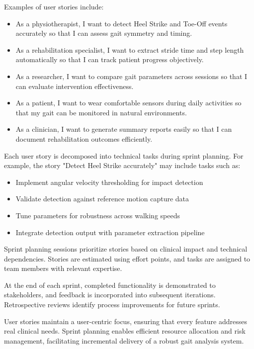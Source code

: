 \documentclass[12pt,a4paper]{report}
\begin{document}
Examples of user stories include:
\begin{itemize}
    

\item As a physiotherapist, I want to detect Heel Strike and Toe-Off events accurately so that I can assess gait symmetry and timing.

\item As a rehabilitation specialist, I want to extract stride time and step length automatically so that I can track patient progress objectively.

\item As a researcher, I want to compare gait parameters across sessions so that I can evaluate intervention effectiveness.

\item As a patient, I want to wear comfortable sensors during daily activities so that my gait can be monitored in natural environments.

\item As a clinician, I want to generate summary reports easily so that I can document rehabilitation outcomes efficiently.
\end{itemize}
Each user story is decomposed into technical tasks during sprint planning. For example, the story "Detect Heel Strike accurately" may include tasks such as:
\begin{itemize}
\item Implement angular velocity thresholding for impact detection

\item Validate detection against reference motion capture data

\item Tune parameters for robustness across walking speeds

\item Integrate detection output with parameter extraction pipeline
\end{itemize}
Sprint planning sessions prioritize stories based on clinical impact and technical dependencies. Stories are estimated using effort points, and tasks are assigned to team members with relevant expertise.

At the end of each sprint, completed functionality is demonstrated to stakeholders, and feedback is incorporated into subsequent iterations. Retrospective reviews identify process improvements for future sprints.

User stories maintain a user-centric focus, ensuring that every feature addresses real clinical needs. Sprint planning enables efficient resource allocation and risk management, facilitating incremental delivery of a robust gait analysis system.
\end{document}
